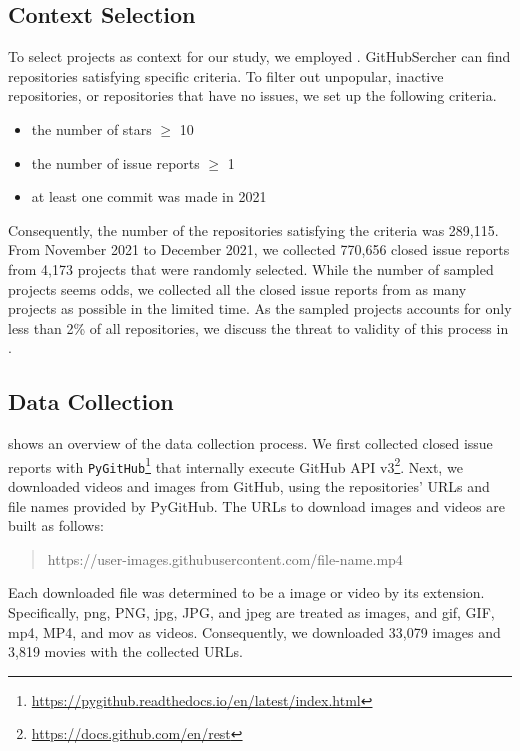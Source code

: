 \subsection{Context Selection}
To select projects as context for our study, we employed . GitHubSercher can find repositories satisfying specific criteria. To filter out unpopular, inactive repositories, or repositories that have no issues, we set up the following criteria.
\begin{itemize}
	\item the number of stars $\geq$ 10
	\item the number of issue reports $\geq$ 1
	\item at least one commit was made in 2021
\end{itemize}
Consequently, the number of the repositories satisfying the criteria was 289,115. From November 2021 to December 2021, we collected 770,656 closed issue reports from 4,173 projects that were randomly selected. While the number of sampled projects seems odds, we collected all the closed issue reports from as many projects as possible in the limited time.  
As the sampled projects accounts for only less than 2\% of all repositories, we discuss the threat to validity of this process in . 




\subsection{Data Collection}
 shows an overview of the data collection process. We first collected closed issue reports with \texttt{PyGitHub}\footnote{\url{https://pygithub.readthedocs.io/en/latest/index.html}} that internally execute GitHub API v3\footnote{\url{https://docs.github.com/en/rest}}. Next, we downloaded videos and images from GitHub, using the repositories' URLs and file names provided by PyGitHub. The URLs to download images and videos are built as follows:
\begin{quote}
	https://user-images.githubusercontent.com/file-name.mp4
\end{quote}
Each downloaded file was determined to be a image or video by its extension. Specifically, png, PNG, jpg, JPG, and jpeg are treated as images, and  gif, GIF, mp4, MP4, and mov as videos.
Consequently, we downloaded 33,079 images and 3,819 movies
with the collected URLs. 

